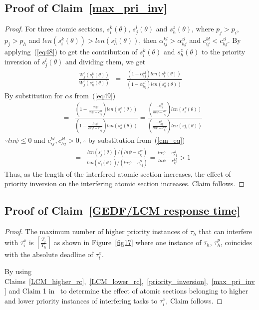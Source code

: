 \documentclass[conference]{sig-alternate}
\begin{document}
\subsection{\label{proof_max_pri_inv} Proof of Claim~\ref{max_pri_inv}}
\begin{proof}
For three atomic sections, $s_i^k(\theta)$, $s_j^l(\theta)$ and $s_h^z(\theta)$, where $p_j>p_i$, $p_j>p_h$ and $len(s_i^k(\theta))>len(s_h^z(\theta))$, then $\alpha_{ij}^{kl}>\alpha_{hj}^{zl}$ and $c_{ij}^{kl}<c_{hj}^{zl}$. By applying~(\ref{eq48}) to get the contribution of $s_i^k(\theta)$ and $s_h^z(\theta)$ to the priority inversion of $s_j^l(\theta)$ and dividing them, we get
\begin{eqnarray*}
\frac{W_{j}^{l}(s_{i}^{k}(\theta))}{W_{j}^{l}(s_{h}^{z}(\theta))} & = & \frac{\left(1-\alpha_{ij}^{kl}\right)len(s_{i}^{k}(\theta))}{\left(1-\alpha_{hj}^{zl}\right)len(s_{h}^{z}(\theta))}
\end{eqnarray*}
By substitution for $\alpha$s from~(\ref{eq49})
\begin{eqnarray*}
 & = & \frac{(1-\frac{ln\psi}{ln\psi-c_{ij}^{kl}})len(s_{i}^{k}(\theta))}{(1-\frac{ln\psi}{ln\psi-c_{hj}^{zl}})len(s_{h}^{z}(\theta))}
  =  \frac{(\frac{-c_{ij}^{kl}}{ln\psi-c_{ij}^{kl}})len(s_{i}^{k}(\theta))}{(\frac{-c_{hj}^{zl}}{ln\psi-c_{hj}^{zl}})len(s_{h}^{z}(\theta))}\end{eqnarray*}
$\because ln\psi \le 0$ and $c_{ij}^{kl},c_{hj}^{kl} > 0, \therefore$ by substitution from~(\ref{cm_eq})
\begin{eqnarray*}
 & = & \frac{len(s_{j}^{l}(\theta))/(ln\psi-c_{ij}^{kl})}{len(s_{j}^{l}(\theta))/(ln\psi-c_{hj}^{zl})}
  =  \frac{ln\psi-c_{hj}^{zl}}{ln\psi-c_{ij}^{kl}}>1\end{eqnarray*}
Thus, as the length of the interfered atomic section increases, the effect of priority inversion on the interfering atomic section increases. Claim follows.
\end{proof}

\subsection{\label{proof_GEDF/LCM response time}Proof of Claim~\ref{GEDF/LCM response time}}
\begin{proof}
The maximum number of higher priority instances of $\tau_h$ that can interfere with $\tau_i^x$ is $\left\lceil\frac{T_i}{T_h}\right\rceil$ as shown in Figure~\ref{fig17} where one instance of $\tau_h$, $\tau_h^p$, coincides with the absolute deadline of $\tau_i^x$.

By using Claims~\ref{LCM_higher_rc},~\ref{LCM_lower_rc},~\ref{priority_inversion},~\ref{max_pri_inv} and Claim 1 in~\cite{stmconcurrencycontrol:emsoft11} to determine the effect of atomic sections belonging to higher and lower priority instances of interfering tasks to $\tau_i^x$, Claim follows.
\end{proof}
\end{document}

